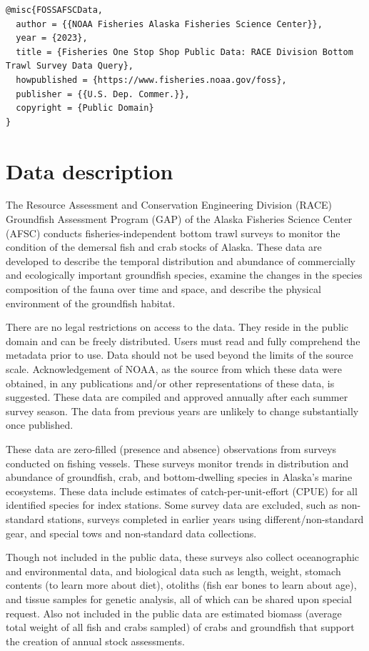 \documentclass[
  letterpaper,
  oneside,
  open=any]{scrbook}
\begin{document}
\begin{verbatim}
@misc{FOSSAFSCData,
  author = {{NOAA Fisheries Alaska Fisheries Science Center}},
  year = {2023}, 
  title = {Fisheries One Stop Shop Public Data: RACE Division Bottom Trawl Survey Data Query},
  howpublished = {https://www.fisheries.noaa.gov/foss},
  publisher = {{U.S. Dep. Commer.}},
  copyright = {Public Domain} 
}
\end{verbatim}

\hypertarget{data-description-3}{%
\chapter{Data description}\label{data-description-3}}

The Resource Assessment and Conservation Engineering Division (RACE)
Groundfish Assessment Program (GAP) of the Alaska Fisheries Science
Center (AFSC) conducts fisheries-independent bottom trawl surveys to
monitor the condition of the demersal fish and crab stocks of Alaska.
These data are developed to describe the temporal distribution and
abundance of commercially and ecologically important groundfish species,
examine the changes in the species composition of the fauna over time
and space, and describe the physical environment of the groundfish
habitat.

There are no legal restrictions on access to the data. They reside in
the public domain and can be freely distributed. Users must read and
fully comprehend the metadata prior to use. Data should not be used
beyond the limits of the source scale. Acknowledgement of NOAA, as the
source from which these data were obtained, in any publications and/or
other representations of these data, is suggested. These data are
compiled and approved annually after each summer survey season. The data
from previous years are unlikely to change substantially once published.

These data are zero-filled (presence and absence) observations from
surveys conducted on fishing vessels. These surveys monitor trends in
distribution and abundance of groundfish, crab, and bottom-dwelling
species in Alaska's marine ecosystems. These data include estimates of
catch-per-unit-effort (CPUE) for all identified species for index
stations. Some survey data are excluded, such as non-standard stations,
surveys completed in earlier years using different/non-standard gear,
and special tows and non-standard data collections.

Though not included in the public data, these surveys also collect
oceanographic and environmental data, and biological data such as
length, weight, stomach contents (to learn more about diet), otoliths
(fish ear bones to learn about age), and tissue samples for genetic
analysis, all of which can be shared upon special request. Also not
included in the public data are estimated biomass (average total weight
of all fish and crabs sampled) of crabs and groundfish that support the
creation of annual stock assessments.
\end{document}
